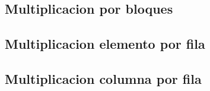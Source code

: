 \subsection{Multiplicacion por bloques}

    \def\model{ByBlocks}
    \def\analisisAmdahl{Podemos observar que}
    \def\analisisGustafson{Podemos ver que}
    
    \newpage

\subsection{Multiplicacion elemento por fila}

    \def\model{ElementByRowBlock}
    \def\analisisAmdahl{Podemos observar que}
    \def\analisisGustafson{Podemos ver que}
    
    \newpage

\subsection{Multiplicacion columna por fila}

    \def\model{ColumnByRow}
    \def\analisisAmdahl{Podemos observar que}
    \def\analisisGustafson{Podemos ver que}
    
    \newpage
